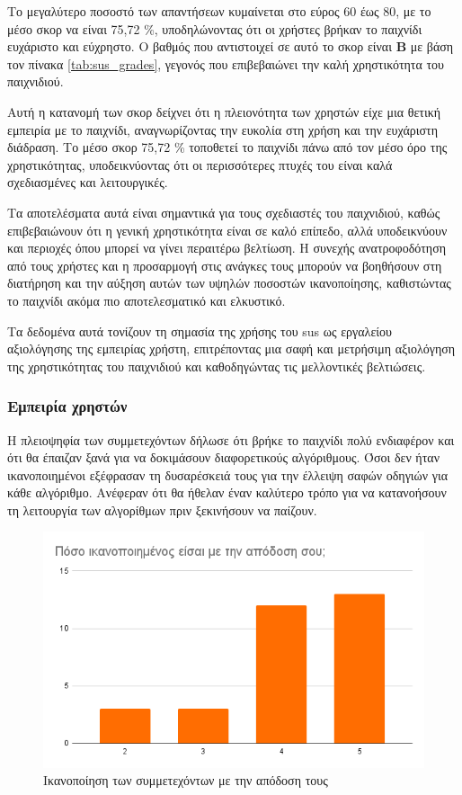 Το μεγαλύτερο ποσοστό των απαντήσεων κυμαίνεται στο εύρος 60 έως 80, με το μέσο σκορ να είναι 75,72 \%, υποδηλώνοντας ότι οι χρήστες βρήκαν το παιχνίδι ευχάριστο και εύχρηστο. Ο βαθμός που αντιστοιχεί σε αυτό το σκορ είναι \textbf{B} με βάση τον πίνακα \ref{tab:sus_grades}, γεγονός που επιβεβαιώνει την καλή χρηστικότητα του παιχνιδιού.

Αυτή η κατανομή των σκορ δείχνει ότι η πλειονότητα των χρηστών είχε μια θετική εμπειρία με το παιχνίδι, αναγνωρίζοντας την ευκολία στη χρήση και την ευχάριστη διάδραση. Το μέσο σκορ 75,72 \% τοποθετεί το παιχνίδι πάνω από τον μέσο όρο της χρηστικότητας, υποδεικνύοντας ότι οι περισσότερες πτυχές του είναι καλά σχεδιασμένες και λειτουργικές.

Τα αποτελέσματα αυτά είναι σημαντικά για τους σχεδιαστές του παιχνιδιού, καθώς επιβεβαιώνουν ότι η γενική χρηστικότητα είναι σε καλό επίπεδο, αλλά υποδεικνύουν και περιοχές όπου μπορεί να γίνει περαιτέρω βελτίωση. Η συνεχής ανατροφοδότηση από τους χρήστες και η προσαρμογή στις ανάγκες τους μπορούν να βοηθήσουν στη διατήρηση και την αύξηση αυτών των υψηλών ποσοστών ικανοποίησης, καθιστώντας το παιχνίδι ακόμα πιο αποτελεσματικό και ελκυστικό.

Τα δεδομένα αυτά τονίζουν τη σημασία της χρήσης του \acrshort{sus} ως εργαλείου αξιολόγησης της εμπειρίας χρήστη, επιτρέποντας μια σαφή και μετρήσιμη αξιολόγηση της χρηστικότητας του παιχνιδιού και καθοδηγώντας τις μελλοντικές βελτιώσεις.


\subsubsection{Εμπειρία χρηστών}

Η πλειοψηφία των συμμετεχόντων δήλωσε ότι βρήκε το παιχνίδι πολύ ενδιαφέρον και ότι θα έπαιζαν ξανά για να δοκιμάσουν διαφορετικούς αλγόριθμους. Όσοι δεν ήταν ικανοποιημένοι εξέφρασαν τη δυσαρέσκειά τους για την έλλειψη σαφών οδηγιών για κάθε αλγόριθμο. Ανέφεραν ότι θα ήθελαν έναν καλύτερο τρόπο για να κατανοήσουν τη λειτουργία των αλγορίθμων πριν ξεκινήσουν να παίζουν.

\begin{figure}[H]
    \centering
    \includegraphics[width=0.7\linewidth]{sections/5/2/images/performance_satisfaction}
    \caption{Ικανοποίηση των συμμετεχόντων με την απόδοση τους}
    \label{fig:performance_satisfaction}
\end{figure}

